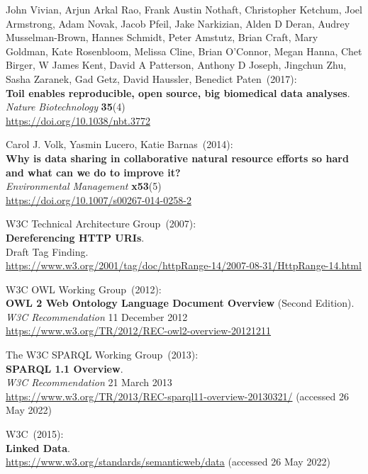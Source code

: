 \begin{thebibliography}{9}
John Vivian, Arjun Arkal Rao, Frank Austin Nothaft, Christopher Ketchum, Joel Armstrong, Adam Novak, Jacob Pfeil, Jake Narkizian, Alden D Deran, Audrey Musselman-Brown, Hannes Schmidt, Peter Amstutz, Brian Craft, Mary Goldman, Kate Rosenbloom, Melissa Cline, Brian O'Connor, Megan Hanna, Chet Birger, W James Kent, David A Patterson, Anthony D Joseph, Jingchun Zhu, Sasha Zaranek, Gad Getz, David Haussler, Benedict Paten~(2017): \\
\textbf{Toil enables reproducible, open source, big biomedical data analyses}.\\
\emph{Nature Biotechnology} \textbf{35}(4)\\
\url{https://doi.org/10.1038/nbt.3772}

Carol J. Volk, Yasmin Lucero, Katie Barnas~(2014): \\
\textbf{Why is data sharing in collaborative natural resource efforts so hard and what can we do to improve it?}\\
\emph{Environmental Management} \textbf{x53}(5) \\
\url{https://doi.org/10.1007/s00267-014-0258-2}

W3C Technical Architecture Group~(2007): \\
\textbf{Dereferencing HTTP URIs}.\\
Draft Tag Finding.\\
\url{https://www.w3.org/2001/tag/doc/httpRange-14/2007-08-31/HttpRange-14.html}

W3C OWL Working Group~(2012): \\
\textbf{{OWL} 2 {Web Ontology Language Document Overview}} ({Second Edition}). \\
\emph{W3C Recommendation} 11 December 2012 \\
\url{https://www.w3.org/TR/2012/REC-owl2-overview-20121211} 

The W3C SPARQL Working Group~(2013): \\
\textbf{{SPARQL} 1.1 {Overview}}. \\
\emph{W3C Recommendation} 21 March 2013 \\
\url{https://www.w3.org/TR/2013/REC-sparql11-overview-20130321/} (accessed 26 May 2022)

W3C~(2015): \\
\textbf{Linked Data}.\\
\url{https://www.w3.org/standards/semanticweb/data} (accessed 26 May 2022)


\end{thebibliography}
